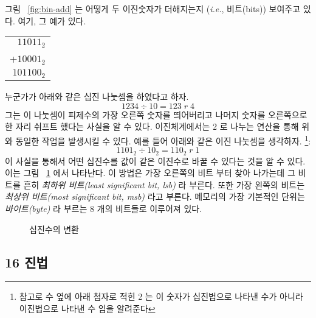 그림 ~\ref{fig:bin-add} 는 어떻게 두 이진숫자가 더해지는지 ({\em i.e.}, 비트(bits)) 보여주고 있다.
여기, 그 예가 있다.
\newline
\begin{center}
\begin{tabular}{r}
 $11011_2$ \\
+$10001_2$ \\
\hline
$101100_2$ \\
\end{tabular}
\end{center}

누군가가 아래와 같은 십진 나눗셈을 하였다고 하자. 
\[ 1234 \div 10 = 123\; r\; 4 \]
그는 이 나눗셈이 피제수의 가장 오른쪽 숫자를 띄어버리고 나머지 숫자를 오른쪽으로 한 자리 쉬프트 했다는 사실을 
알 수 있다. 이진체계에서는 2 로 나누는 연산을 통해 위와 동일한 작업을 발생시킬 수 있다. 예를 들어 아래와 같은
이진 나눗셈을 생각하자. \footnote{참고로 수 옆에 아래 첨자로 적힌 2 는 이 숫자가 십진법으로 나타낸 수가 아니라
이진법으로 나타낸 수 임을 알려준다}:
\[ 1101_2 \div 10_2 = 110_2\; r\; 1 \]
이 사실을 통해서 어떤 십진수를 값이 같은 이진수로 바꿀 수 있다는 것을 알 수 있다. 이는 그림 ~\ref{fig:dec-convert}
에서 나타난다. 이 방법은 가장 오른쪽의 비트 부터 찾아 나가는데 그 비트를 흔히 \emph{최하위 비트(least significant bit, lsb)} 
라 부른다. 또한 가장 왼쪽의 비트는 \emph{최상위 비트(most significant bit, msb)} 라고 부른다. 메모리의 가장 기본적인
단위는 \emph{바이트(byte)} 라 부르는 8 개의 비트들로 이루어져 있다. 


\begin{figure}[t]
\centering
{}
\caption{십진수의 변환 \label{fig:dec-convert}}
\end{figure}

\subsection{16 진법}

